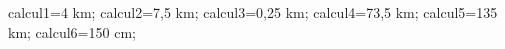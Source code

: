 \documentclass[exercice]{thedocument}%
\begin{document}
%
    \>calcul1=4 km;%
    \>calcul2=7,5 km;%
    \>calcul3=0,25 km;%
    \>calcul4=73,5 km;%
    \>calcul5=135 km;%
    \>calcul6=150 cm;%
\end{document}
